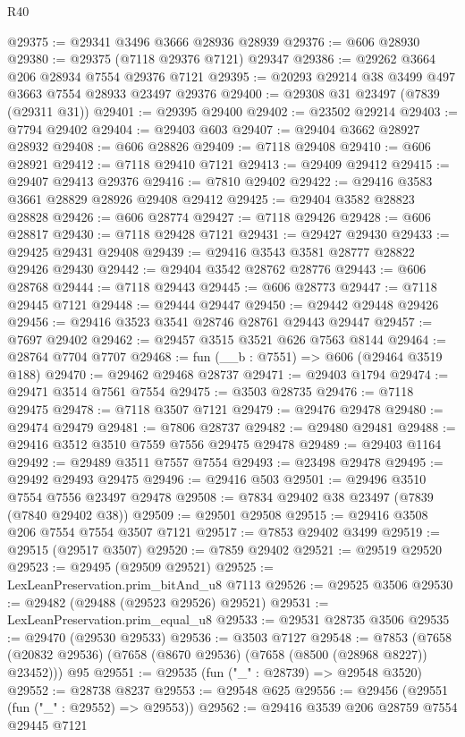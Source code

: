 \begin{lexlean}{R40}
\begin{coremodule}
@29375 := @29341 @3496 @3666 @28936 @28939
@29376 := @606 @28930
@29380 := @29375 (@7118 @29376 @7121) @29347
@29386 := @29262 @3664 @206 @28934 @7554 @29376 @7121
@29395 := @20293 @29214 @38 @3499 @497 @3663 @7554 @28933 @23497 @29376
@29400 := @29308 @31 @23497 (@7839 (@29311 @31))
@29401 := @29395 @29400
@29402 := @23502 @29214
@29403 := @7794 @29402
@29404 := @29403 @603
@29407 := @29404 @3662 @28927 @28932
@29408 := @606 @28826
@29409 := @7118 @29408
@29410 := @606 @28921
@29412 := @7118 @29410 @7121
@29413 := @29409 @29412
@29415 := @29407 @29413 @29376
@29416 := @7810 @29402
@29422 := @29416 @3583 @3661 @28829 @28926 @29408 @29412
@29425 := @29404 @3582 @28823 @28828
@29426 := @606 @28774
@29427 := @7118 @29426
@29428 := @606 @28817
@29430 := @7118 @29428 @7121
@29431 := @29427 @29430
@29433 := @29425 @29431 @29408
@29439 := @29416 @3543 @3581 @28777 @28822 @29426 @29430
@29442 := @29404 @3542 @28762 @28776
@29443 := @606 @28768
@29444 := @7118 @29443
@29445 := @606 @28773
@29447 := @7118 @29445 @7121
@29448 := @29444 @29447
@29450 := @29442 @29448 @29426
@29456 := @29416 @3523 @3541 @28746 @28761 @29443 @29447
@29457 := @7697 @29402
@29462 := @29457 @3515 @3521 @626 @7563 @8144
@29464 := @28764 @7704 @7707
@29468 := fun (__b : @7551) => @606 (@29464 @3519 @188)
@29470 := @29462 @29468 @28737
@29471 := @29403 @1794
@29474 := @29471 @3514 @7561 @7554
@29475 := @3503 @28735
@29476 := @7118 @29475
@29478 := @7118 @3507 @7121
@29479 := @29476 @29478
@29480 := @29474 @29479
@29481 := @7806 @28737
@29482 := @29480 @29481
@29488 := @29416 @3512 @3510 @7559 @7556 @29475 @29478
@29489 := @29403 @1164
@29492 := @29489 @3511 @7557 @7554
@29493 := @23498 @29478
@29495 := @29492 @29493 @29475
@29496 := @29416 @503
@29501 := @29496 @3510 @7554 @7556 @23497 @29478
@29508 := @7834 @29402 @38 @23497 (@7839 (@7840 @29402 @38))
@29509 := @29501 @29508
@29515 := @29416 @3508 @206 @7554 @7554 @3507 @7121
@29517 := @7853 @29402 @3499
@29519 := @29515 (@29517 @3507)
@29520 := @7859 @29402
@29521 := @29519 @29520
@29523 := @29495 (@29509 @29521)
@29525 := LexLeanPreservation.prim_bitAnd_u8 @7113
@29526 := @29525 @3506
@29530 := @29482 (@29488 (@29523 @29526) @29521)
@29531 := LexLeanPreservation.prim_equal_u8
@29533 := @29531 @28735 @3506
@29535 := @29470 (@29530 @29533)
@29536 := @3503 @7127
@29548 := @7853
    (@7658 (@20832 @29536) (@7658 (@8670 @29536) (@7658 (@8500 (@28968 @8227)) @23452)))
    @95
@29551 := @29535 (fun ("_" : @28739) => @29548 @3520)
@29552 := @28738 @8237
@29553 := @29548 @625
@29556 := @29456 (@29551 (fun ("_" : @29552) => @29553))
@29562 := @29416 @3539 @206 @28759 @7554 @29445 @7121

\end{coremodule}
\end{lexlean}

